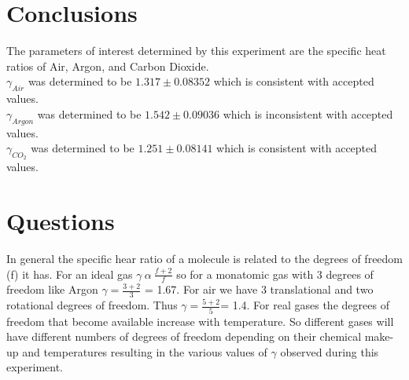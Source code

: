 \documentclass{article}
\begin{document}
\section{Conclusions}
The parameters of interest determined by this experiment are the specific heat ratios of Air, Argon, and Carbon Dioxide.\\
$\gamma_{Air}$ was determined to be $1.317 \pm 0.08352$ which is consistent with accepted values.\\
$\gamma_{Argon}$ was determined to be $1.542 \pm 0.09036 $ which is inconsistent with accepted values.\\
$\gamma_{CO_2}$ was determined to be $1.251 \pm 0.08141$ which is consistent with accepted values.\\



\section{Questions}
In general the specific hear ratio of a molecule is related to the degrees of freedom (f) it has. For an ideal gas $\gamma \ \alpha \   \frac{f+2}{f}$ so for a monatomic gas with 3 degrees of freedom like Argon $\gamma = \frac{3+2}{3}$ = 1.67.
For air we have 3 translational and two rotational degrees of freedom. Thus $\gamma = \frac{5+2}{5}$= 1.4. For real gases the degrees of freedom that become available increase with temperature. So different gases will have different numbers of degrees of freedom depending on their chemical make-up and temperatures resulting in the various values of $\gamma$ observed during this experiment.
\end{document}
